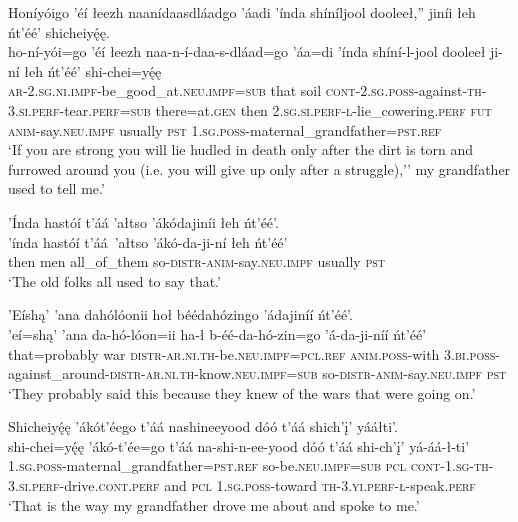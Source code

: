 \ea\label{ex:text1-6-5}
Honíyóigo ’éí łeezh naanídaasdláadgo ’áadi ’índa shíníljool dooleeł,'' jiníi łeh ńt’éé’ shicheiyę́ę.\\
\gll ho-ní-yói=go	’éí	łeezh	naa-n-í-daa-s-dláad=go	’áa=di	’índa	shíní-l-jool	dooleeł	ji-ní	łeh	ńt’éé’	shi-chei=yę́ę\\
     \textsc{ar}-2.\textsc{sg}.\textsc{ni}.\textsc{impf}-be\_good\_at.\textsc{neu}.\textsc{impf}=\textsc{sub}	that	soil	\textsc{cont}-2.\textsc{sg}.\textsc{poss}-against-\textsc{th}-3.\textsc{si}.\textsc{perf}-tear.\textsc{perf}=\textsc{sub}	there=at.\textsc{gen}	then	2.\textsc{sg}.\textsc{si}.\textsc{perf}-\textsc{l}-lie\_cowering.\textsc{perf}	\textsc{fut}	\textsc{anim}-say.\textsc{neu}.\textsc{impf}	usually	\textsc{pst}	1.\textsc{sg}.\textsc{poss}-maternal\_grandfather=\textsc{pst}.\textsc{ref}\\
\glt `If you are strong you will lie hudled in death only after the dirt is torn and furrowed around you (i.e. you will give up only after a struggle),'' my grandfather used to tell me.'
\z

\newpage
\ea\label{ex:text1-6-6}
’Índa hastóí t’áá ’ałtso ’ákódajiníi łeh ńt’éé’.\\
\gll ’índa	hastóí	t’áá~{’ałtso}	’ákó-da-ji-ní	łeh	ńt’éé’\\
     then	men	all\_of\_them	so-\textsc{distr}-\textsc{anim}-say.\textsc{neu}.\textsc{impf}	usually	\textsc{pst}\\
\glt `The old folks all used to say that.'
\z

\ea\label{ex:text1-7-1}
’Eíshą’ ’ana dahólóonii hoł béédahózingo ’ádajiníí ńt’éé’.\\
\gll ’eí=shą’	’ana	da-hó-lóon=ii	ha-ł	b-éé-da-hó-zin=go	’á-da-ji-níí	ńt’éé’\\
     that=probably	war	\textsc{distr}-\textsc{ar}.\textsc{ni}.\textsc{th}-be.\textsc{neu}.\textsc{impf}=\textsc{pcl}.\textsc{ref}	\textsc{anim}.\textsc{poss}-with	3.\textsc{bi}.\textsc{poss}-against\_around-\textsc{distr}-\textsc{ar}.\textsc{ni}.\textsc{th}-know.\textsc{neu}.\textsc{impf}=\textsc{sub}	so-\textsc{distr}-\textsc{anim}-say.\textsc{neu}.\textsc{impf}	\textsc{pst}\\
\glt `They probably said this because they knew of the wars that were going on.'
\z

\ea\label{ex:text1-7-2}
Shicheiyę́ę ’ákót’éego t’áá nashineeyood dóó t’áá shich’į’ yááłti’.\\
\gll shi-chei=yę́ę	’ákó-t’ée=go	t’áá	na-shi-n-ee-yood	dóó	t’áá	shi-ch’į’	yá-áá-ł-ti’\\
     1.\textsc{sg}.\textsc{poss}-maternal\_grandfather=\textsc{pst}.\textsc{ref}	so-be.\textsc{neu}.\textsc{impf}=\textsc{sub}	\textsc{pcl}	\textsc{cont}-1.\textsc{sg}-\textsc{th}-3.\textsc{si}.\textsc{perf}-drive.\textsc{cont}.\textsc{perf}	and	\textsc{pcl}	1.\textsc{sg}.\textsc{poss}-toward	\textsc{th}-3.\textsc{yi}.\textsc{perf}-\textsc{ł}-speak.\textsc{perf}\\
\glt `That is the way my grandfather drove me about and spoke to me.'
\z


